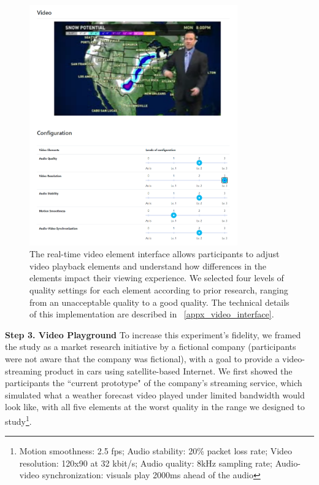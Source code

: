\begin{figure}[htpb]
    \centering
    \includegraphics[width=0.8\textwidth, keepaspectratio=true]{content/image/video_playground.png}
    \caption{
        The real-time video element interface allows participants to adjust video playback elements and understand how differences in the elements impact their viewing experience. We selected four levels of quality settings for each element according to prior research, ranging from an unacceptable quality to a good quality. The technical details of this implementation are described in ~\cref{appx_video_interface}.
    }
    \label{fig:exp2_playground}
\end{figure}

\textbf{Step 3. Video Playground} To increase this experiment's fidelity, we framed the study as a market research initiative by a fictional company (participants were not aware that the company was fictional), with a goal to provide a video-streaming product in cars using satellite-based Internet. We first showed the participants the ``current prototype" of the company's streaming service, which simulated what a weather forecast video played under limited bandwidth would look like, with all five elements at the worst quality in the range we designed to study\footnote{Motion smoothness: 2.5 fps; Audio stability: 20\% packet loss rate; Video resolution: 120x90 at 32 kbit/s; Audio quality: 8kHz sampling rate; Audio-video synchronization: visuals play 2000ms ahead of the audio}. 

